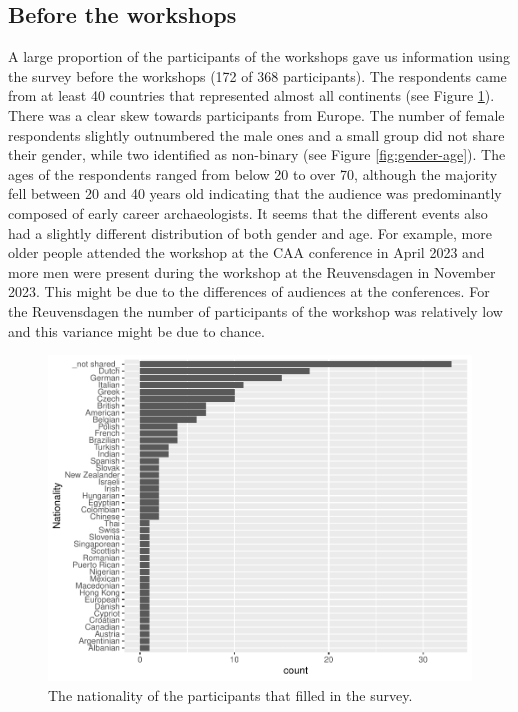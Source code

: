 \documentclass[
]{article}
\begin{document}
\hypertarget{before-the-workshops}{%
\subsection{Before the workshops}\label{before-the-workshops}}

A large proportion of the participants of the workshops gave us information using the survey before the workshops (172 of 368 participants). The respondents came from at least 40 countries that represented almost all continents (see Figure \ref{fig:nationality}). There was a clear skew towards participants from Europe. The number of female respondents slightly outnumbered the male ones and a small group did not share their gender, while two identified as non-binary (see Figure \ref{fig:gender-age}). The ages of the respondents ranged from below 20 to over 70, although the majority fell between 20 and 40 years old indicating that the audience was predominantly composed of early career archaeologists. It seems that the different events also had a slightly different distribution of both gender and age. For example, more older people attended the workshop at the CAA conference in April 2023 and more men were present during the workshop at the Reuvensdagen in November 2023. This might be due to the differences of audiences at the conferences. For the Reuvensdagen the number of participants of the workshop was relatively low and this variance might be due to chance.

\begin{figure}
\centering
\includegraphics{paper_files/figure-latex/nationality-1.pdf}
\caption{\label{fig:nationality}The nationality of the participants that filled in the survey.}
\end{figure}
\end{document}
